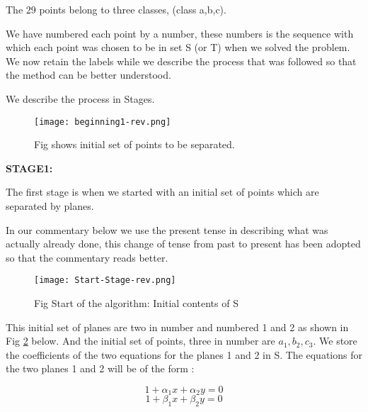 \documentclass[english]{article}
\begin{document}
The 29 points belong to three classes, (class a,b,c). 

We have numbered each point by a number, these numbers is the sequence
with which each point was chosen to be in set  S (or T) when we solved
the problem. We now retain the labels while we describe the process
that was followed so that the method can be better understood. 

We describe the process in Stages.

\medskip{}

\begin{figure}[htp]
 \begin{center}
 
\texttt{[image: beginning1-rev.png]}
\caption{Fig shows initial set of points to be separated.}

\label{fig:fig-c} \end{center}
\end{figure} 


\medskip{}


\textbf{STAGE1:}

The first stage is when we started with an initial set of points which
are separated by planes.

In our commentary below we use the present tense in describing what
was actually already done, this change of tense from past to present
has been adopted so that the commentary reads better. 

\medskip{}
\begin{figure}[htp]
 \begin{center}
 
\texttt{[image: Start-Stage-rev.png]}
\caption{Fig Start of the algorithm: Initial contents of S}

\label{fig:fig-i} \end{center}
\end{figure} 

This initial set of planes are two in number and numbered 1 and 2
as shown in Fig \ref{fig:fig-i}
below. And the initial set of points, three in number are
$a_{1},b_{2},c_{3}$. We store the coefficients of the two equations
for the planes 1 and 2 in S. The equations for the two planes 1 and
2 will be of the form :

\begin{equation}
1+\alpha_{1}x+\alpha_{2}y=0
\end{equation}
\begin{equation}
1+\beta_{1}x+\beta_{2}y=0
\end{equation}
\end{document}
